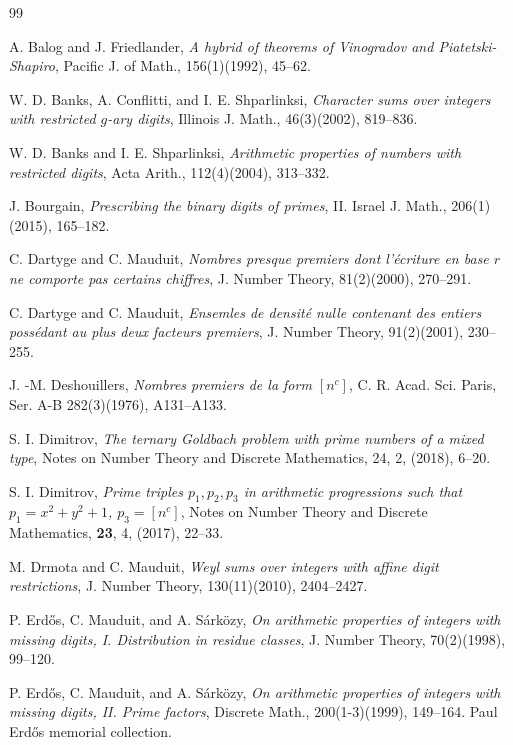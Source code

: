 \documentclass{amsart}
\numberwithin{equation}{subsection}
\begin{document}
%
%
%
%
\vspace{10mm}
\begin{thebibliography}{99}%

 A. Balog and J. Friedlander, \textit{A hybrid of theorems of Vinogradov and Piatetski-Shapiro}, Pacific J. of Math., 156(1)(1992), 45--62.

 W. D. Banks, A. Conflitti, and I. E. Shparlinksi, \textit{Character sums over integers with restricted $g$-ary digits}, Illinois J. Math., 46(3)(2002), 819--836.

 W. D. Banks and I. E. Shparlinksi, \textit{Arithmetic properties of numbers with restricted digits}, Acta Arith., 112(4)(2004), 313--332.

 J. Bourgain, \textit{Prescribing the binary digits of primes}, II. Israel J. Math., 206(1)(2015), 165--182.

 C. Dartyge and C. Mauduit, \textit{Nombres presque premiers dont l'\'{e}criture en base $r$ ne comporte pas certains chiffres}, J. Number Theory, 81(2)(2000), 270--291.

 C. Dartyge and C. Mauduit, \textit{Ensemles de densit\'{e} nulle contenant des entiers poss\'edant au plus deux facteurs premiers}, J. Number Theory, 91(2)(2001), 230--255.

 J. -M. Deshouillers, \textit{Nombres premiers de la form $[n^c]$}, C. R. Acad. Sci. Paris, Ser. A-B 282(3)(1976), A131--A133.

 S. I. Dimitrov, \textit{The ternary Goldbach problem with prime numbers of a
mixed type}, Notes on Number Theory and Discrete Mathematics, 24, 2,
(2018), 6--20.

 S. I. Dimitrov, \textit{Prime triples $p_1,p_2,p_3$ in arithmetic progressions
such that $p_1=x^2+y^2+1$,\; $p_3=[n^c]$}, Notes on Number Theory and
Discrete Mathematics,
\textbf{23}, 4, (2017), 22--33.

 M. Drmota and C. Mauduit, \textit{Weyl sums over integers with affine digit restrictions}, J. Number Theory, 130(11)(2010), 2404--2427.

 P. Erd\H{o}s, C. Mauduit, and A. S\'{a}rk\"{o}zy, \textit{On arithmetic properties of integers with missing digits, I. Distribution in residue classes}, J. Number Theory, 70(2)(1998), 99--120. 

 P. Erd\H{o}s, C. Mauduit, and A. S\'{a}rk\"{o}zy, \textit{On arithmetic properties of integers with missing digits, II. Prime factors}, Discrete Math., 200(1-3)(1999), 149--164. Paul Erd\H{o}s memorial collection.




\end{thebibliography}
\end{document}
